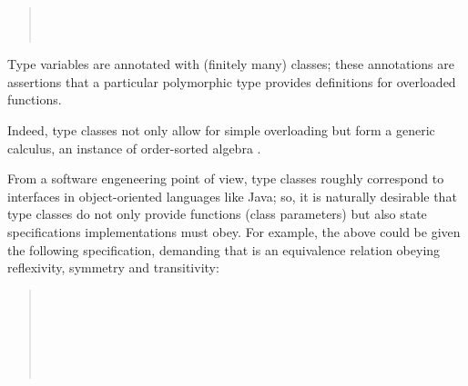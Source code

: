 \begin{isabellebody}
\begin{isamarkuptext}
\begin{quote}
  \medskip\noindent{} \\
  \hspace*{2ex} \\
  \hspace*{2ex}

  \end{quote}

  \noindent Type variables are annotated with (finitely many) classes;
  these annotations are assertions that a particular polymorphic type
  provides definitions for overloaded functions.

  Indeed, type classes not only allow for simple overloading
  but form a generic calculus, an instance of order-sorted
  algebra \cite{Nipkow-Prehofer:1993,nipkow-sorts93,Wenzel:1997:TPHOL}.

  From a software engeneering point of view, type classes
  roughly correspond to interfaces in object-oriented languages like Java;
  so, it is naturally desirable that type classes do not only
  provide functions (class parameters) but also state specifications
  implementations must obey.  For example, the 
  above could be given the following specification, demanding that
   is an equivalence relation obeying reflexivity,
  symmetry and transitivity:

  \begin{quote}

  \noindent{} \\
  \hspace*{2ex} \\
   \\
  \hspace*{2ex} \\
  \hspace*{2ex} \\
  \hspace*{2ex}

  \end{quote}


\end{isamarkuptext}
\end{isabellebody}
